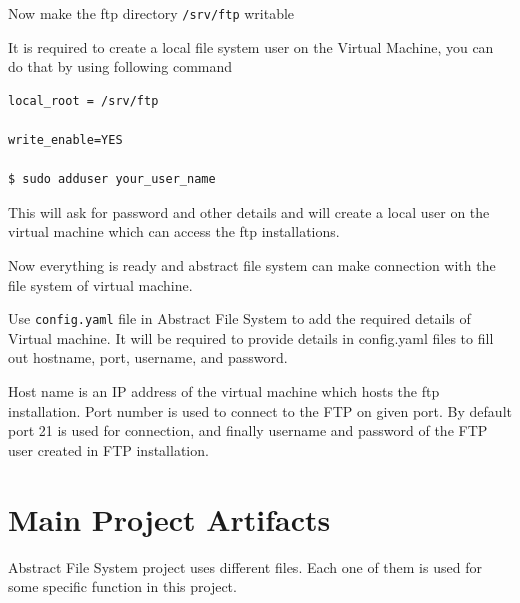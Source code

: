 Now make the ftp directory \verb|/srv/ftp| writable 


It is required to create a local file system user on the Virtual Machine, you 
can do that by using following command

\begin{verbatim}
local_root = /srv/ftp  

write_enable=YES       

$ sudo adduser your_user_name    
\end{verbatim}

This will ask for password and other details and will create a local user on 
the virtual machine which can access the ftp installations.

Now everything is ready and abstract file system can make connection with the 
file system of virtual machine.





Use \verb|config.yaml| file in Abstract File System to add the required
details of Virtual machine.  It will be required to provide details in
config.yaml files to fill out hostname, port, username, and password.


Host name is an IP address of the virtual machine which hosts the ftp 
installation. Port number is used to connect to the FTP on given port. By 
default port 21 is used for connection, and finally username and password of 
the FTP user created in FTP installation.





\section{Main Project Artifacts}

Abstract File System project uses different files. 
Each one of them is used for some specific function in this project.

